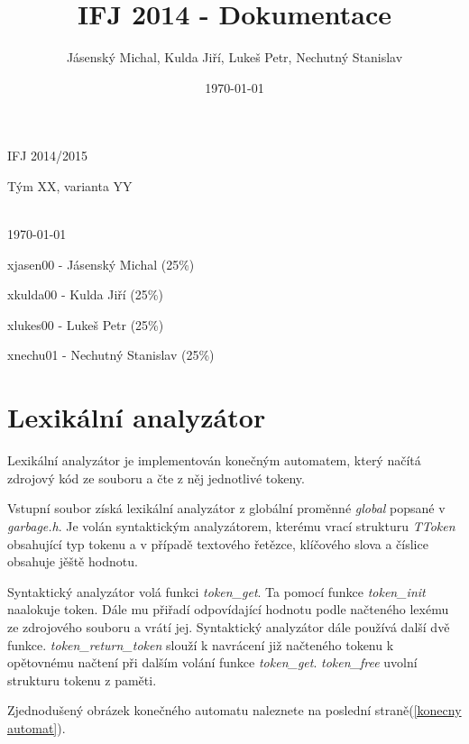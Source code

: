 \documentclass[a4paper]{article}
\title{IFJ 2014 - Dokumentace}
\author{Jásenský Michal, Kulda Jiří, Lukeš Petr, Nechutný Stanislav}
\date{\today}
\begin{document}
\begin{center}
	\begin{LARGE}IFJ 2014/2015\end{LARGE}

	\begin{Large}Tým XX, varianta YY\end{Large}
	\\ [6in]
	
	\today
\end{center}

	xjasen00 - Jásenský Michal (25\%)

	xkulda00 - Kulda Jiří  (25\%)
	
	xlukes00 - Lukeš Petr  (25\%)
	
	xnechu01 - Nechutný Stanislav  (25\%)


	


\pagebreak

\section{Lexikální analyzátor} \label{lexika}

Lexikální analyzátor je implementován konečným automatem, který načítá zdrojový kód ze souboru a 
čte z něj jednotlivé tokeny. 

Vstupní soubor získá lexikální analyzátor z globální proměnné \textit{global} popsané v \textit{garbage.h}. 
Je volán syntaktickým analyzátorem, kterému vrací strukturu \textit{TToken} obsahující typ tokenu a v případě 
textového řetězce, klíčového slova a číslice obsahuje jěště hodnotu.

Syntaktický analyzátor volá funkci \textit{token\_get}. Ta pomocí funkce \textit{token\_init} naalokuje 
token. Dále mu přiřadí odpovídající hodnotu  podle načteného lexému ze zdrojového souboru a vrátí jej. 
Syntaktický analyzátor dále používá další dvě funkce. \textit{token\_return_token} slouží k navrácení již 
načteného tokenu k opětovnému načtení při dalším volání funkce \textit{token\_get}. \textit{token\_free} uvolní strukturu tokenu z paměti.

Zjednodušený obrázek konečného automatu naleznete na poslední straně(\ref{konecny automat}).
\end{document}
